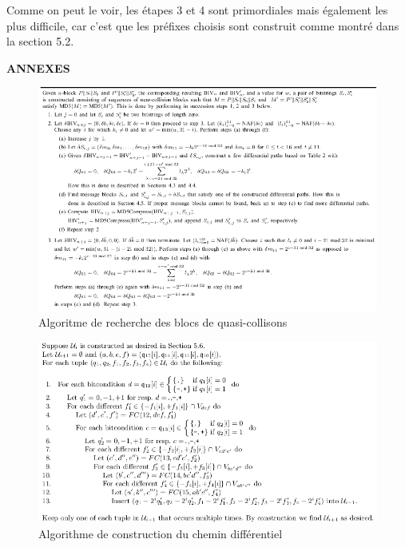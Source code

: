 \documentclass[a4paper,11pt,french]{article}
\begin{document}
Comme on peut le voir, les étapes 3 et 4 sont primordiales mais également les plus difficile, car c'est que les préfixes choisis sont construit comme montré dans la section 5.2.

\newpage
\vspace{3cm}
\bf{\LARGE{ANNEXES}}\\
\vspace{1cm}

\begin{figure}[h!]
  \includegraphics[scale=.61]{ncb.png}
  \caption{Algoritme de recherche des blocs de quasi-collisons}
\end{figure}

\begin{figure}[h!]
  \includegraphics[scale=.61]{ui.png}
  \caption{Algorithme de construction du chemin différentiel}
\end{figure}
\end{document}
